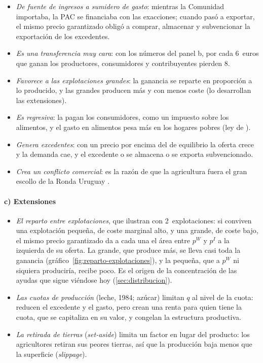 \documentclass[11pt]{article}
\begin{document}
\begin{itemize}
\item \emph{De fuente de ingresos a sumidero de gasto}: mientras la Comunidad importaba, la PAC se financiaba con las exacciones; cuando pasó a exportar, el mismo precio garantizado obligó a comprar, almacenar y subvencionar la exportación de los excedentes.
\item \emph{Es una transferencia muy cara}: con los números del panel b, por cada 6~euros que ganan los productores, consumidores y contribuyentes pierden 8.
\item \emph{Favorece a las explotaciones grandes}: la ganancia se reparte en proporción a lo producido, y las grandes producen más y con menos coste (lo desarrollan las extensiones).
\item \emph{Es regresiva}: la pagan los consumidores, como un impuesto sobre los alimentos, y el gasto en alimentos pesa más en los hogares pobres (ley de ).
\item \emph{Genera excedentes}: con un precio por encima del de equilibrio la oferta crece y la demanda cae, y el excedente o se almacena o se exporta subvencionado.
\item \emph{Crea un conflicto comercial}: es la razón de que la agricultura fuera el gran escollo de la Ronda Uruguay .
\end{itemize}

\paragraph{c) Extensiones}

\begin{itemize}
\item \emph{El reparto entre explotaciones}, que \textcite[fig.~9.5]{BaldwinWyplosz2020Economics} ilustran con 2~explotaciones: si conviven una explotación pequeña, de coste marginal alto, y una grande, de coste bajo, el mismo precio garantizado da a cada una el área entre $p^W$ y $p^I$ a la izquierda de su oferta. La grande, que produce más, se lleva casi toda la ganancia (gráfico~\ref{fig:reparto-explotaciones}), y la pequeña, que a $p^W$ ni siquiera produciría, recibe poco. Es el origen de la concentración de las ayudas que sigue viéndose hoy (\ref{sec:distribucion}).
\item \emph{Las cuotas de producción} (leche, 1984; azúcar) limitan $q$ al nivel de la cuota: reducen el excedente y el gasto, pero crean una renta para quien tiene la cuota, que se capitaliza en su valor, y congelan la estructura productiva.
\item \emph{La retirada de tierras} (\emph{set-aside}) limita un factor en lugar del producto: los agricultores retiran sus peores tierras, así que la producción baja menos que la superficie (\emph{slippage}).
\end{itemize}
\end{document}
